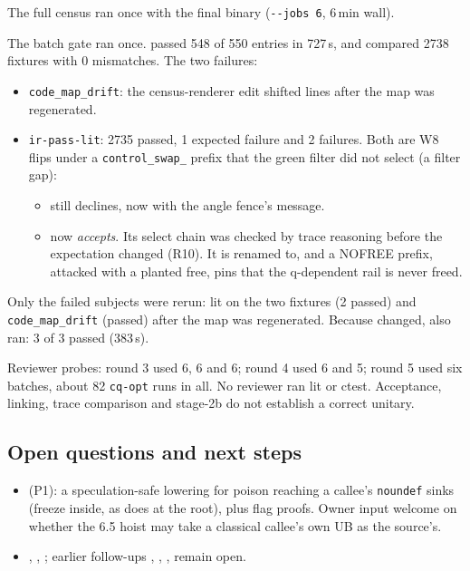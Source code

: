 The full census ran once with the final binary (\texttt{-{}-jobs 6}, 6\,min wall).

The batch gate ran once. 
passed 548 of 550 entries in 727\,s, and
 compared 2738
fixtures with 0 mismatches. The two failures:
\begin{itemize}
\item \texttt{code\_map\_drift}: the census-renderer edit shifted lines after
the map was regenerated.
\item \texttt{ir-pass-lit}: 2735 passed, 1 expected failure and 2 failures. Both are
W8 flips under a \texttt{control\_swap\_} prefix that the green filter did not
select (a filter gap):
\begin{itemize}
\item {} still declines, now with the
angle fence's message.
\item {} now \emph{accepts}. Its select
chain was checked by trace reasoning before the expectation changed (R10). It is
renamed to\newline {}, and a
NOFREE prefix, attacked with a planted free, pins that the q-dependent rail is never
freed.
\end{itemize}
\end{itemize}
Only the failed subjects were rerun: lit on the two fixtures (2 passed) and
\texttt{code\_map\_drift} (passed) after the map was regenerated. Because
 changed,
 also ran: 3 of 3 passed (383\,s).

Reviewer probes: round 3 used 6, 6 and 6; round 4 used 6 and 5; round 5 used six
batches, about 82 \texttt{cq-opt} runs in all. No reviewer ran lit or ctest.
Acceptance, linking, trace comparison and stage-2b do not establish a correct
unitary.

\subsection*{Open questions and next steps}
\begin{itemize}
\item {} (P1): a speculation-safe lowering for poison reaching a callee's
\texttt{noundef} sinks (freeze inside, as  does at the root), plus flag
proofs. Owner input welcome on whether the 6.5 hoist may take a classical callee's
own UB as the source's.
\item {}, , ; earlier follow-ups ,
, ,  remain open.
\end{itemize}

